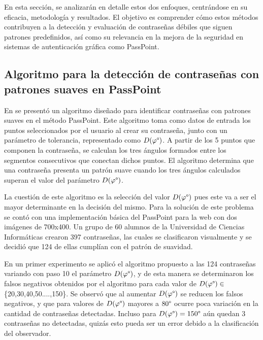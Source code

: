 \documentclass[12pt]{report}
\begin{document}
	En esta sección, se analizarán en detalle estos dos enfoques, centrándose en su eficacia, metodología y resultados. El objetivo es comprender cómo estos métodos contribuyen a la detección y evaluación de contraseñas débiles que siguen patrones predefinidos, así como su relevancia en la mejora de la seguridad en sistemas de autenticación gráfica como PassPoint.

\subsection{Algoritmo para la detección de contraseñas con patrones suaves en PassPoint}

En \cite{3} se presentó un algoritmo diseñado para identificar contraseñas con patrones suaves en el método PassPoint. Este algoritmo toma como datos de entrada los puntos seleccionados por el usuario al crear su contraseña, junto con un parámetro de tolerancia, representado como $D(\varphi\degree)$. A partir de los 5 puntos que componen la contraseña, se calculan los tres ángulos formados entre los segmentos consecutivos que conectan dichos puntos. El algoritmo determina que una contraseña presenta un patrón suave cuando los tres ángulos calculados superan el valor del parámetro $D(\varphi\degree)$.

La cuestión de este algoritmo es la selección del valor $D(\varphi\degree)$ pues este va a ser el mayor determinante en la decisión del mismo. Para la solución de este problema se contó con una implementación básica del PassPoint para la web con dos imágenes de 700x400. Un grupo de 60 alumnos de la Universidad de Ciencias Informáticas crearon 397 contraseñas, las cuales se clasificaron visualmente y se decidió que 124 de ellas cumplían con el patrón de suavidad. 

En un primer experimento se aplicó el algoritmo propuesto a las 124 contraseñas variando con paso 10 el parámetro $D(\varphi\degree)$, y de esta manera se determinaron los falsos negativos obtenidos por el algoritmo para cada valor de $D(\varphi\degree)\in$ \{20,30,40,50....,150\}. Se observó que al aumentar $D(\varphi\degree)$ se reducen los falsos negativos, y que para valores de $D(\varphi\degree)$ mayores a $80\degree$  ocurre poca variación en la cantidad de contraseñas detectadas. Incluso para $D(\varphi\degree)=150\degree$  aún quedan 3 contraseñas no detectadas, quizás esto pueda ser un error debido a la clasificación del observador.
\end{document}
